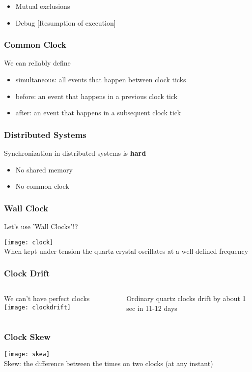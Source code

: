 \documentclass[aspectratio=169, 15pt,usenames,dvipsnames]{beamer}
\begin{document}
{\begin{gdblank}
\begin{itemize}
			      \pause
			\item Mutual exclusions
			\item Debug [Resumption of execution]
		\end{itemize}
	\end{gdblank}
	\begin{gdblank}
		\frametitle{Common Clock}
		\LARGE
		We can reliably define
		\pause
		\begin{itemize}
			\item simultaneous: all events that happen between clock ticks
			      \pause
			\item before: an event that happens in a previous clock tick
			      \pause
			\item after: an event that happens in a subsequent clock tick
		\end{itemize}
	\end{gdblank}
	\begin{gdblank}
		\frametitle{Distributed Systems}
		\LARGE
		Synchronization in distributed systems is \bf hard
		\begin{itemize}
			\item No shared memory
			\item No common clock
		\end{itemize}
	\end{gdblank}
	\begin{gdblank}
		\frametitle{Wall Clock}		
		\centering
		\LARGE	
		Let's use 'Wall Clocks'!?
		\par
		\texttt{[image: clock]}
		\small
		\\When kept under tension the quartz crystal oscillates at a well-defined frequency
	\end{gdblank}
	\begin{gdblank}
		\frametitle{Clock Drift}
		\begin{columns}
			\begin{column}{0.6\textwidth}
				We can't have perfect clocks
				\texttt{[image: clockdrift]}
			\end{column}
			\begin{column}{0.4\textwidth}
				Ordinary quartz clocks drift by about 1 sec in 11-12 days
			\end{column}
		\end{columns}
	\end{gdblank}
	\begin{gdblank}
		\frametitle{Clock Skew}
		\centering
		\texttt{[image: skew]}
		\\Skew: the difference between the times on two clocks (at any instant)

\end{gdblank}}
\end{document}
